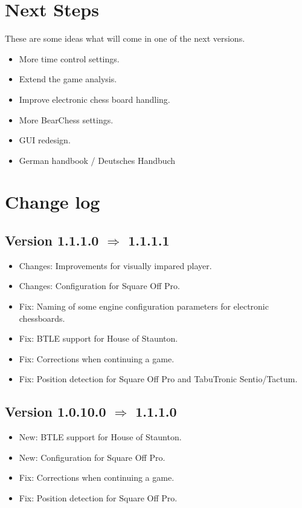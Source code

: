 \documentclass[11pt,a4paper]{article}
\begin{document}
\section{Next Steps}

These are some ideas what will come in one of the next versions.

\begin{itemize}			
	    \item More time control settings.
		\item Extend the game analysis.
		\item Improve electronic chess board handling.  	    
    	\item More BearChess settings.
   		\item GUI redesign.
   		\item German handbook / Deutsches Handbuch
\end{itemize} 

\pagebreak

\listoffigures

\pagebreak

\section{Change log}

\subsection*{Version 1.1.1.0 $\Rightarrow$  1.1.1.1}
\begin{itemize}			
	\item {\color{teal}Changes}: Improvements for visually impared player.
	\item {\color{teal}Changes}: Configuration for Square Off Pro.
	\item {\color{red}Fix}: Naming of some engine configuration parameters for electronic chessboards.
	\item {\color{red}Fix}: BTLE support for House of Staunton.
	\item {\color{red}Fix}: Corrections when continuing a game.
	\item {\color{red}Fix}: Position detection for Square Off Pro and TabuTronic Sentio/Tactum.
\end{itemize}

\subsection*{Version 1.0.10.0 $\Rightarrow$  1.1.1.0}
\begin{itemize}			
		\item {\color{blue}New}: BTLE support for House of Staunton.
		\item {\color{blue}New}: Configuration for Square Off Pro.
		\item {\color{red}Fix}: Corrections when continuing a game.
		\item {\color{red}Fix}: Position detection for Square Off Pro.
\end{itemize}
	
\end{document}
